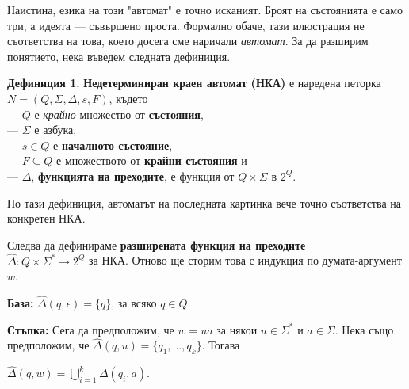 \documentclass{article}
\begin{document}
    Наистина, езика на този "автомат" \hspace{0.01cm} е точно исканият. Броят на състоянията е само три,
    а идеята — съвършено проста. Формално обаче, тази илюстрация не съответства на това,
    което досега сме наричали \textit{автомат}. За да разширим понятието, нека
    въведем следната дефиниция.

    \vspace{15pt}

    \textbf{Дефиниция 1.} \textbf{Недетерминиран краен автомат (НКА)} е наредена петорка $N = (Q, \Sigma, \Delta, s, F)$, където \\
    — $Q$ е \textit{крайно} множество от \textbf{състояния}, \\
    — $\Sigma$ е азбука, \\
    — $s \in Q$ е \textbf{началното състояние}, \\
    — $F \subseteq Q$ е множеството от \textbf{крайни състояния} и \\
    — $\Delta$, \textbf{функцията на преходите}, е функция от $Q \times \Sigma$ в $2^Q$.
 
    \vspace{15pt}

    По тази дефиниция, автоматът на последната картинка вече точно съответства на 
    конкретен НКА.
    
    \vspace{5pt}

    Следва да дефинираме \textbf{разширената функция на преходите} \\ $\hat{\Delta} : Q \times \Sigma^* \rightarrow 2^Q$
    за НКА. Отново ще сторим това с индукция по думата-аргумент $w$.

    \vspace{5pt}

    \textbf{База:} $\hat{\Delta}(q,\epsilon) = \{q\}$, за всяко $q \in Q$.

    \vspace{5pt}

    \textbf{Стъпка:} Сега да предположим, че $w = ua$ за някои $u \in \Sigma^*$ и 
    $a \in \Sigma$. Нека също предположим, че $\hat{\Delta}(q,u) = \{q_1,...,q_k\}$. 
    Тогава \\
    \begin{center}
        $\hat{\Delta}(q,w) = \bigcup\limits_{i=1}^k \Delta(q_i,a)$.
    \end{center}

    \vspace{5pt}
\end{document}
